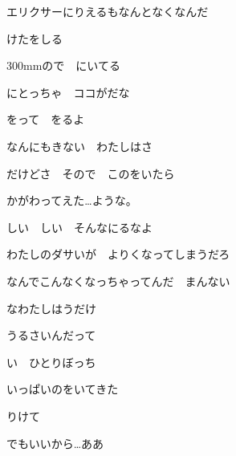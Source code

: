 \documentclass[a4paper,tate,twocolumn,12pt]{ltjtarticle}
\begin{document}
\begin{flushleft}
\vspace{2em}

\noindent\begin{minipage}{\linewidth}
エリクサーにりえるもなんとなくなんだ

けたをしる

300mmので　にいてる

にとっちゃ　ココがだな
\end{minipage}

\vspace{2em}

\noindent\begin{minipage}{\linewidth}
をって　をるよ

なんにもきない　わたしはさ

だけどさ　そので　このをいたら

かがわってえた…ような。
\end{minipage}

\vspace{2em}

\noindent\begin{minipage}{\linewidth}
しい　しい　そんなにるなよ

わたしのダサいが　よりくなってしまうだろ

なんでこんなくなっちゃってんだ　まんない

なわたしはうだけ

うるさいんだって　
\end{minipage}

\vspace{2em}

\noindent\begin{minipage}{\linewidth}
い　ひとりぼっち

いっぱいのをいてきた

りけて　

でもいいから…ああ


\end{minipage}
\end{flushleft}
\end{document}
